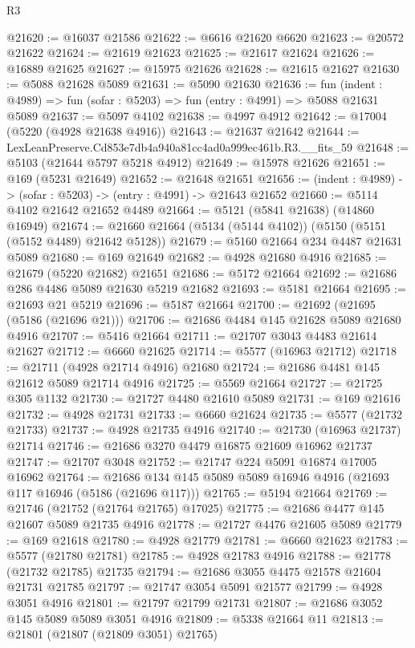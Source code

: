 \begin{lexlean}{R3}
\begin{coremodule}
@21620 := @16037 @21586
@21622 := @6616 @21620 @6620
@21623 := @20572 @21622
@21624 := @21619 @21623
@21625 := @21617 @21624
@21626 := @16889 @21625
@21627 := @15975 @21626
@21628 := @21615 @21627
@21630 := @5088 @21628 @5089
@21631 := @5090 @21630
@21636 := fun (indent : @4989) => fun (sofar : @5203) => fun (entry : @4991) => @5088 @21631 @5089
@21637 := @5097 @4102
@21638 := @4997 @4912
@21642 := @17004 (@5220 (@4928 @21638 @4916))
@21643 := @21637 @21642
@21644 := LexLeanPreserve.Cd853e7db4a940a81cc4ad0a999ec461b.R3.__fits_59
@21648 := @5103 (@21644 @5797 @5218 @4912)
@21649 := @15978 @21626
@21651 := @169 (@5231 @21649)
@21652 := @21648 @21651
@21656 := (indent : @4989) -> (sofar : @5203) -> (entry : @4991) -> @21643 @21652
@21660 := @5114 @4102 @21642 @21652 @4489
@21664 := @5121 (@5841 @21638) (@14860 @16949)
@21674 := @21660 @21664 (@5134 (@5144 @4102)) (@5150 (@5151 (@5152 @4489) @21642 @5128))
@21679 := @5160 @21664 @234 @4487 @21631 @5089
@21680 := @169 @21649
@21682 := @4928 @21680 @4916
@21685 := @21679 (@5220 @21682) @21651
@21686 := @5172 @21664
@21692 := @21686 @286 @4486 @5089 @21630 @5219 @21682
@21693 := @5181 @21664
@21695 := @21693 @21 @5219
@21696 := @5187 @21664
@21700 := @21692 (@21695 (@5186 (@21696 @21)))
@21706 := @21686 @4484 @145 @21628 @5089 @21680 @4916
@21707 := @5416 @21664
@21711 := @21707 @3043 @4483 @21614 @21627
@21712 := @6660 @21625
@21714 := @5577 (@16963 @21712)
@21718 := @21711 (@4928 @21714 @4916) @21680
@21724 := @21686 @4481 @145 @21612 @5089 @21714 @4916
@21725 := @5569 @21664
@21727 := @21725 @305 @1132
@21730 := @21727 @4480 @21610 @5089
@21731 := @169 @21616
@21732 := @4928 @21731
@21733 := @6660 @21624
@21735 := @5577 (@21732 @21733)
@21737 := @4928 @21735 @4916
@21740 := @21730 (@16963 @21737) @21714
@21746 := @21686 @3270 @4479 @16875 @21609 @16962 @21737
@21747 := @21707 @3048
@21752 := @21747 @224 @5091 @16874 @17005 @16962
@21764 := @21686 @134 @145 @5089 @5089 @16946 @4916 (@21693 @117 @16946 (@5186 (@21696 @117)))
@21765 := @5194 @21664
@21769 := @21746 (@21752 (@21764 @21765) @17025)
@21775 := @21686 @4477 @145 @21607 @5089 @21735 @4916
@21778 := @21727 @4476 @21605 @5089
@21779 := @169 @21618
@21780 := @4928 @21779
@21781 := @6660 @21623
@21783 := @5577 (@21780 @21781)
@21785 := @4928 @21783 @4916
@21788 := @21778 (@21732 @21785) @21735
@21794 := @21686 @3055 @4475 @21578 @21604 @21731 @21785
@21797 := @21747 @3054 @5091 @21577
@21799 := @4928 @3051 @4916
@21801 := @21797 @21799 @21731
@21807 := @21686 @3052 @145 @5089 @5089 @3051 @4916
@21809 := @5338 @21664 @11
@21813 := @21801 (@21807 (@21809 @3051) @21765)

\end{coremodule}
\end{lexlean}
